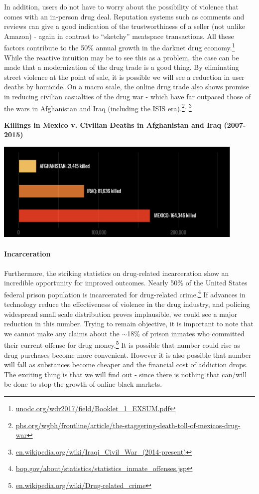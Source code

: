 \documentclass[12pt]{article}
\begin{document}
In addition, users do not have to worry about the possibility of violence that comes with an in-person drug deal. Reputation systems such as comments and reviews can give a good indication of the trustworthiness of a seller (not unlike Amazon) - again in contrast to ``sketchy'' meatspace transactions. All these factors contribute to the 50\% annual growth in the darknet drug economy.\footnote{\url{unodc.org/wdr2017/field/Booklet_1_EXSUM.pdf}}
\\

While the reactive intuition may be to see this as a problem, the case can be made that a modernization of the drug trade is a good thing. By eliminating street violence at the point of sale, it is possible we will see a reduction in user deaths by homicide. On a macro scale, the online drug trade also shows promise in reducing civilian casualties of the drug war - which have far outpaced those of the wars in Afghanistan and 
Iraq (including the ISIS era).\footnote{\url{pbs.org/wgbh/frontline/article/the-staggering-death-toll-of-mexicos-drug-war}}$^,$ \footnote{\url{en.wikipedia.org/wiki/Iraqi_Civil_War_(2014-present)}}


\begin{center}
\bigskip
\large{\textbf{Killings in Mexico v. Civilian Deaths in Afghanistan and Iraq (2007-2015)}}
\bigskip

\includegraphics[width=12cm]{civilians.png}
\bigskip
\end{center}


\paragraph{Incarceration} Furthermore, the striking statistics on drug-related incarceration show an incredible opportunity for improved outcomes. Nearly 50\% of the United States federal prison population is incarcerated for drug-related crime.\footnote{\url{bop.gov/about/statistics/statistics_inmate_offenses.jsp}}  If advances in technology reduce the effectiveness of violence in the drug industry, and policing widespread small scale distribution proves implausible, we could see a major reduction in this number. Trying to remain objective, it is important to note that we cannot make any claims about the $\sim$18\% of prison inmates who committed their current offense for drug money.\footnote{\url{en.wikipedia.org/wiki/Drug-related_crime}} It is possible that number could rise as drug purchases become more convenient. However it is also possible that number will fall as substances become cheaper and the financial cost of addiction drops. The exciting thing is that we will find out - since there is nothing that can/will be done to stop the growth of online black markets.
\\
\end{document}
